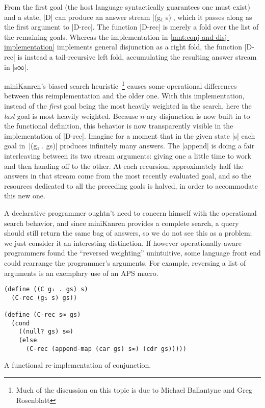\documentclass[sigplan,screen,draft,anonymous,review,natbib=false]{acmart}
\begin{document}
From the first goal (the host language syntactically guarantees one
must exist) and a state, \rackinline|D| can produce an answer stream
\rackinline|(g₁ s)|, which it passes along as the first argument to
\rackinline|D-rec|. The function \rackinline|D-rec| is merely a fold
over the list of the remaining goals. Whereas the implementation in
\cref{mnt:conj-and-disj-implementation} implements general disjunction
as a right fold, the function \rackinline|D-rec| is instead a
tail-recursive left fold, accumulating the resulting answer stream in
\rackinline|s∞|.

miniKanren's biased search heuristic~\footnote{Much of the discussion
  on this topic is due to Michael Ballantyne and Greg Rosenblatt}
causes some operational differences between this reimplementation and
the older one. With this implementation, instead of the \emph{first}
goal being the most heavily weighted in the search, here the
\emph{last} goal is most heavily weighted. Because $n$-ary disjunction
is now built in to the functional definition, this behavior is now
transparently visible in the implementation of \rackinline|D-rec|.
Imagine for a moment that in the given state \rackinline|s| each goal
in~\rackinline|(g₁ . gs)| produces infinitely many answers. The
\rackinline|append| is doing a fair interleaving between its two
stream arguments: giving one a little time to work and then handing
off to the other. At each recursion, approximately half the answers in
that stream come from the most recently evaluated goal, and so the
resources dedicated to all the preceding goals is halved, in order to
accommodate this new one.

A declarative programmer oughtn't need to concern himself with the
operational search behavior, and since miniKanren provides a complete
search, a query should still return the same bag of answers, so we do
not see this as a problem; we just consider it an interesting
distinction. If however operationally-aware programmers found the
\enquote{reversed weighting} unintuitive, some language front end
could rearrange the programmer's arguments. For example, reversing a
list of arguments is an exemplary use of an APS macro.

\begin{listing}
  \begin{verbatim}
(define ((C g₁ . gs) s)
  (C-rec (g₁ s) gs))

(define (C-rec s∞ gs)
  (cond
    ((null? gs) s∞)
    (else
      (C-rec (append-map (car gs) s∞) (cdr gs)))))
  \end{verbatim}
  \caption{A functional re-implementation of conjunction.}
  \label{mnt:conj-re-implementation}
\end{listing}
\end{document}
